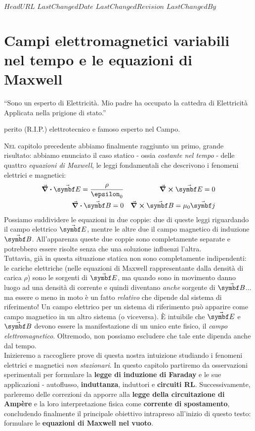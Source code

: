 \svnidlong
{$HeadURL$}
{$LastChangedDate$}
{$LastChangedRevision$}
{$LastChangedBy$}

\chapter{Campi elettromagnetici variabili nel tempo e le equazioni di Maxwell}

\begin{introduction}
	``Sono un esperto di Elettricità. Mio padre ha occupato la cattedra di Elettricità Applicata nella	prigione di stato.''
	\begin{flushright}
		 perito (R.I.P.) elettrotecnico e famoso esperto nel Campo.
	\end{flushright}
\end{introduction}
\lettrine[findent=1pt, nindent=0pt]{N}{el} capitolo precedente abbiamo finalmente raggiunto un primo, grande risultato: abbiamo enunciato il caso statico  - ossia \textit{costante nel tempo} - delle quattro \textit{equazioni di Maxwell}, le leggi fondamentali che descrivono i fenomeni elettrici e magnetici:
\begin{align*}
	\div{\vba{E}}=\frac{\rho}{\epsilon_0}&&\curl{\vba{E}}=0\\
	\div{\vba{B}}=0&&\curl{\vba{B}}=\mu_0\vba{j}
\end{align*}
Possiamo suddividere le equazioni in due coppie: due di queste leggi riguardando il campo elettrico $\vba{E}$, mentre le altre due il campo magnetico di induzione $\vba{B}$. All'apparenza queste due coppie sono completamente separate e potrebbero essere risolte senza che una soluzione influenzi l'altra.\\
Tuttavia, già in questa situazione statica non sono completamente indipendenti: le cariche elettriche (nelle equazioni di Maxwell rappresentante dalla densità di carica $\rho$) sono le sorgenti di $\vba{E}$, ma quando sono in movimento danno luogo ad una densità di corrente e quindi diventano \textit{anche} sorgente di $\vba{B}$... ma essere o meno in moto è un fatto \textit{relativo} che dipende dal sistema di riferimento! Un campo elettrico per un sistema di riferimento può apparire come campo magnetico in un altro sistema (o viceversa). È intuibile che $\vba{E}$ e $\vba{B}$ devono essere la manifestazione di un unico ente fisico, il \textit{campo elettromagnetico}. Oltremodo, non possiamo escludere che tale ente dipenda anche dal tempo.\\
Inizieremo a raccogliere prove di questa nostra intuizione studiando i fenomeni elettrici e magnetici \textit{non stazionari}. In questo capitolo partiremo da osservazioni sperimentali per formulare la \textbf{legge di induzione di Faraday} e le sue applicazioni - autoflusso, \textbf{induttanza}, induttori e \textbf{circuiti RL}. Successivamente, parleremo delle correzioni da apporre alla \textbf{legge della circuitazione di Ampère} e la loro interpretazione fisica come \textbf{corrente di spostamento}, concludendo finalmente il principale obiettivo intrapreso all'inizio di questo testo: formulare le \textbf{equazioni di Maxwell nel vuoto}.

